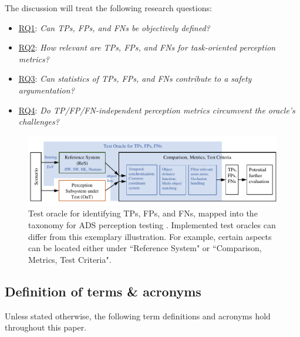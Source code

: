 \documentclass[conference]{IEEEtran}
\begin{document}





The discussion will treat the following research questions:
\begin{itemize}


\item \hyperref[sec:discussion_rq1]{RQ1}: \textit{Can TPs, FPs, and FNs be objectively defined?}

\item \hyperref[sec:discussion_rq2]{RQ2}: \textit{How relevant are TPs, FPs, and FNs for task-oriented perception metrics?}

\item \hyperref[sec:discussion_rq3]{RQ3}: \textit{Can statistics of TPs, FPs, and FNs contribute to a safety argumentation?}

\item \hyperref[sec:discussion_rq4]{RQ4}: \textit{Do TP/FP/FN-independent perception metrics circumvent the oracle's challenges?}
\end{itemize}

\begin{figure}[t]
	\centering
	\vspace*{2mm}
	\includegraphics[width=\textwidth]{img/taxonomy_with_oracle.pdf}
	
	\caption{Test oracle for identifying TPs, FPs, and FNs, mapped into the taxonomy for ADS perception testing \cite{Hoss2022review, stellet2015testing}. Implemented test oracles can differ from this exemplary illustration. For example, certain aspects can be located either under ``Reference System" or ``Comparison, Metrics, Test Criteria".
	}
	\label{fig:oracle_in_taxonomy}
\end{figure}


\subsection{Definition of terms \& acronyms}
Unless stated otherwise, the following term definitions and acronyms hold throughout this paper.
\end{document}
